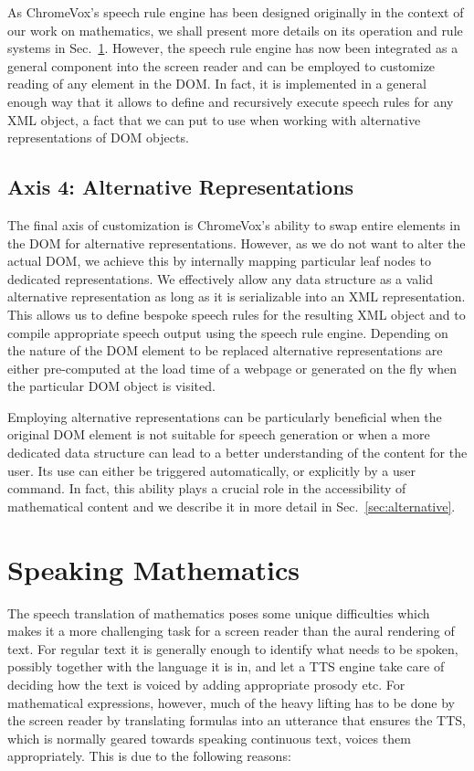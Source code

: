 \documentclass{sig-alternate}
\begin{document}
As ChromeVox's speech rule engine has been designed originally in the context of
our work on mathematics, we shall present more details on
its operation and rule systems in Sec.~\ref{sec:translate}. However, the speech
rule engine has now been integrated as a general component into the screen
reader and can be employed to customize reading of any element in the DOM. In
fact, it is implemented in a general enough way that it allows to define and
recursively execute speech rules for any XML object, a fact that we can put to
use when working with alternative representations of DOM objects.


\subsection{Axis 4: Alternative Representations}
\label{sec:ax4}


The final axis of customization is ChromeVox's ability to swap entire elements
in the DOM for alternative representations. However, as we do not want to alter
the actual DOM, we achieve this by internally mapping particular leaf nodes to
dedicated representations.  We effectively allow any data structure as a valid
alternative representation as long as it is serializable into an XML
representation. This allows us to define bespoke speech rules for the resulting
XML object and to compile appropriate speech output using the speech rule
engine. Depending on the nature of the DOM element to be replaced alternative
representations are either pre-computed at the load time of a webpage or
generated on the fly when the particular DOM object is visited.

Employing alternative representations can be particularly beneficial when the
original DOM element is not suitable for speech generation or when a more
dedicated data structure can lead to a better understanding of the content
for the user. Its use can either be triggered automatically, or explicitly by a
user command. In fact, this ability plays a crucial role in the accessibility of
mathematical content and we describe it in more detail in
Sec.~\ref{sec:alternative}.


\section{Speaking Mathematics}
\label{sec:translate}

The speech translation of mathematics poses some unique difficulties which makes
it a more challenging task for a screen reader than the aural rendering of
text. For regular text it is generally enough to identify what needs to be
spoken, possibly together with the language it is in, and let a TTS engine take
care of deciding how the text is voiced by adding appropriate prosody etc. For
mathematical expressions, however, much of the heavy lifting has to be done by
the screen reader by translating formulas into an utterance that ensures the
TTS, which is normally geared towards speaking continuous text, voices them
appropriately. This is due to the following reasons:
\end{document}
